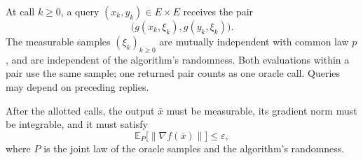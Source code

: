 \documentclass[10pt]{article}
\theoremstyle{definition}
\begin{document}
At call $k\geq0$, a query $(x_k,y_k)\in E\times E$ receives the pair
\[
\bigl(g(x_k,\xi_k),g(y_k,\xi_k)\bigr).
\]
The measurable samples $(\xi_k)_{k\geq0}$ are mutually independent with common law $p$, and are independent of the algorithm's randomness. Both evaluations within a pair use the same sample; one returned pair counts as one oracle call. Queries may depend on preceding replies.

After the allotted calls, the output $\bar{x}$ must be measurable, its gradient norm must be integrable, and it must satisfy
\[
\mathbb{E}_{P}\bigl[\|\nabla f(\bar{x})\|\bigr]\leq\varepsilon,
\]
where $P$ is the joint law of the oracle samples and the algorithm's randomness.
\end{document}
